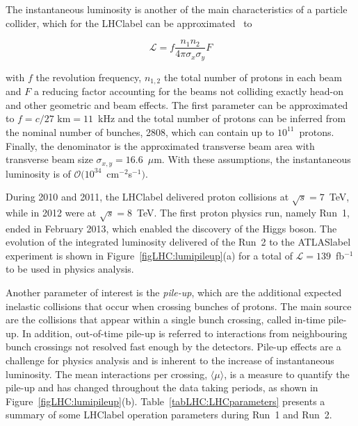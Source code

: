 The instantaneous luminosity is another of the main characteristics of a particle collider, which for the \acrshort{LHClabel} can be approximated~\cite{luminosity} to

\begin{equation}
    \mathcal{L} = f \frac{n_1n_2}{4\pi\sigma_x\sigma_y} F
\end{equation}

with $f$ the revolution frequency, $n_{1,2}$ the total number of protons in each beam and $F$ a reducing factor accounting for the beams not colliding exactly head-on and other geometric and beam effects. The first parameter can be approximated to $f=c/27\text{ km} = 11$~kHz and the total number of protons can be inferred from the nominal number of bunches, 2808, which can contain up to $10^{11}$~protons. Finally, the denominator is the approximated transverse beam area with transverse beam size $\sigma_{x,y} = 16.6$~$\mu$m. With these assumptions, the instantaneous luminosity is of $\mathcal{O}(10^{34}$~cm$^{-2}$s$^{-1})$.

During 2010 and 2011, the \acrshort{LHClabel} delivered proton collisions at $\sqrt{s}=7$~TeV, while in 2012 were at $\sqrt{s}=8$~TeV. The first proton physics run, namely Run~1, ended in February 2013, which enabled the discovery of the Higgs boson. The evolution of the integrated luminosity delivered of the Run~2 to the \acrshort{ATLASlabel} experiment is shown in Figure~\ref{figLHC:lumipileup}(a) for a total of $\mathscr{L}=139$~fb$^{-1}$ to be used in physics analysis.

Another parameter of interest is the \textit{pile-up}, which are the additional expected inelastic collisions that occur when crossing bunches of protons. The main source are the collisions that appear within a single bunch crossing, called in-time pile-up. In addition, out-of-time pile-up is referred to interactions from neighbouring bunch crossings not resolved fast enough by the detectors. Pile-up effects are a challenge for physics analysis and is inherent to the increase of instantaneous luminosity. %
The mean interactions per crossing, $\langle\mu\rangle$, is a measure to quantify the pile-up and has changed throughout the data taking periods, as shown in Figure~\ref{figLHC:lumipileup}(b). Table~\ref{tabLHC:LHCparameters} presents a summary of some \acrshort{LHClabel} operation parameters during Run~1 and Run~2.

